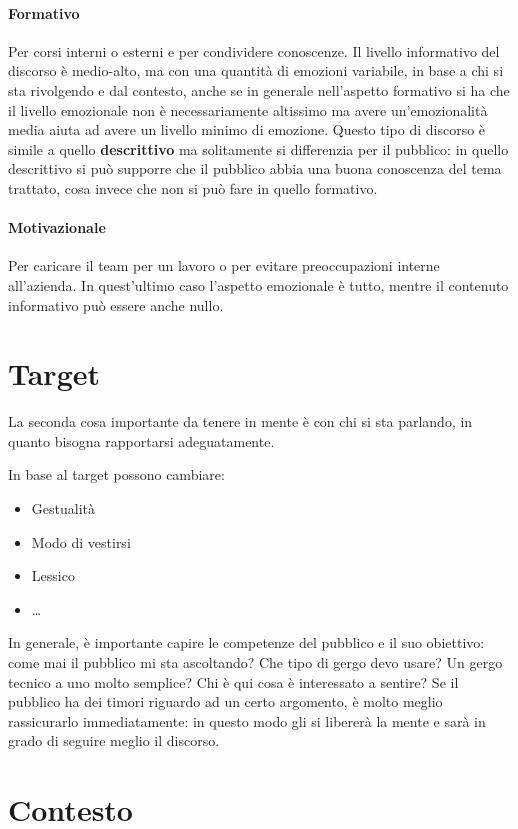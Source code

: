 \paragraph*{Formativo} Per corsi interni o esterni e per condividere conoscenze.
Il livello informativo del discorso è medio-alto, ma con una quantità di emozioni
variabile, in base a chi si sta rivolgendo e dal contesto, anche se in generale
nell'aspetto formativo si ha che il livello emozionale non è necessariamente
altissimo ma avere un'emozionalità media aiuta ad avere un livello minimo di
emozione. Questo tipo di discorso è simile a quello \textbf{descrittivo} ma
solitamente si differenzia per il pubblico: in quello descrittivo si può
supporre che il pubblico abbia una buona conoscenza del tema trattato, cosa
invece che non si può fare in quello formativo.

\paragraph*{Motivazionale} Per caricare il team per un lavoro o per evitare
preoccupazioni interne all'azienda. In quest'ultimo caso l'aspetto emozionale è
tutto, mentre il contenuto informativo può essere anche nullo.

\section{Target}
La seconda cosa importante da tenere in mente è con chi si sta parlando, in
quanto bisogna rapportarsi adeguatamente.

In base al target possono cambiare:
\begin{itemize}
 \item Gestualità
 \item Modo di vestirsi
 \item Lessico
 \item \dots
\end{itemize}

In generale, è importante capire le competenze del pubblico e il suo obiettivo:
come mai il pubblico mi sta ascoltando? Che tipo di gergo devo usare? Un gergo
tecnico a uno molto semplice? Chi è qui cosa è interessato a sentire? Se il
pubblico ha dei timori riguardo ad un certo argomento, è molto meglio
rassicurarlo immediatamente: in questo modo gli si libererà la mente e sarà in
grado di seguire meglio il discorso.

\section{Contesto}

